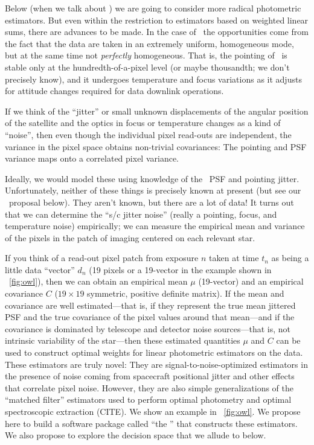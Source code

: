 \documentclass[letterpaper,12pt,preprint]{hack_aastex}
\begin{document}
Below (when we talk about \kpsf) we are going to consider more radical
photometric estimators.
But even within the restriction to estimators based on weighted linear sums,
there are advances to be made.
In the case of \Kepler\ the opportunities come from the fact that the data
are taken in an extremely uniform, homogeneous mode, but at the same time not
\emph{perfectly} homogeneous.
That is, the pointing of \Kepler\ is stable only at the hundredth-of-a-pixel
level (or maybe thousandth; we don't precisely know), and it undergoes
temperature and focus variations as it adjusts for attitude changes required
for data downlink operations.

If we think of the ``jitter'' or small unknown displacements of the angular
position of the satellite and the optics in focus or temperature changes as a
kind of ``noise'', then even though the individual pixel read-outs are
independent, the variance in the pixel space obtains non-trivial covariances:
The pointing and PSF variance maps onto a correlated pixel variance.

Ideally, we would model these using knowledge of the \Kepler\ PSF and
pointing jitter.
Unfortunately, neither of these things is precisely known at present (but see
our \kpsf\ proposal below).
They aren't known, but there are a lot of data!
It turns out that we can determine the ``s/c jitter noise'' (really a pointing,
focus, and temperature noise) empirically;
we can measure the empirical mean and variance of the pixels in the patch of
imaging centered on each relevant star.

If you think of a read-out pixel patch from exposure $n$ taken at time
$t_n$ as being a little data ``vector'' $d_n$ (19 pixels or a 19-vector
in the example shown in \figurename~\ref{fig:owl}), then we can obtain an
empirical mean $\mu$ (19-vector) and an empirical covariance $C$ ($19\times 19$
symmetric, positive definite matrix).
If the mean and covariance are well estimated---that is, if they
represent the true mean jittered PSF and the true covariance of the
pixel values around that mean---and if the covariance is dominated by
telescope and detector noise sources---that is, not intrinsic
variability of the star---then these estimated quantities $\mu$ and
$C$ can be used to construct optimal weights for linear photometric
estimators on the data.
These estimators are truly novel:
They are signal-to-noise-optimized estimators in the presence of noise coming
from spacecraft positional jitter and other effects that correlate pixel noise.
However, they are also simple generalizations of the ``matched filter''
estimators used to perform optimal photometry and optimal spectroscopic
extraction (CITE).
We show an example in \figurename~\ref{fig:owl}.
We propose here to build a software package called ``the \OWL'' that constructs
these estimators.
We also propose to explore the decision space that we allude to below.
\end{document}
